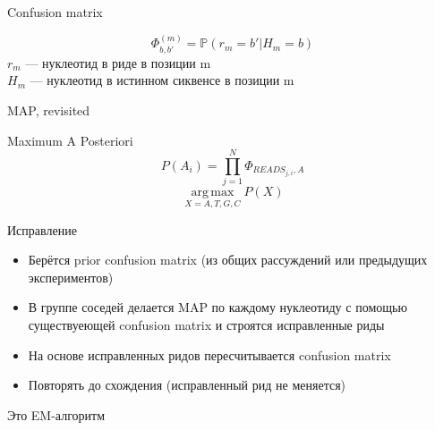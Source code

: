 \documentclass[10pt]{beamer}
\begin{document}
\begin{frame}{Confusion matrix}
  \begin{center}
    \Large
    \begin{equation*}
      \Phi^{(m)}_{b,b'} = \mathds{P}(r_m = b' | H_m = b)
    \end{equation*}
    \large
    $r_m$ — нуклеотид в риде в позиции m\\
    $H_m$ — нуклеотид в истинном сиквенсе в позиции m
  \end{center}
\end{frame}

\begin{frame}{MAP, revisited}
  \begin{center}
    \Large
    Maximum A Posteriori
    \[P(A_i) = \prod_{j=1}^{N} \Phi_{READS_{j,i}, A}\]
    \[\operatorname*{arg\,max}_{X=A,T,G,C} P(X)\]
  \end{center}
\end{frame}

\begin{frame}{Исправление}
  \begin{itemize}
  \item Берётся prior confusion matrix (из общих рассуждений или
    предыдущих экспериментов)
  \item В группе соседей делается MAP по каждому нуклеотиду с помощью
    существуеющей confusion matrix и строятся исправленные риды
  \item На основе исправленных ридов пересчитывается confusion matrix
  \item Повторять до схождения (исправленный рид не меняется)
  \end{itemize}
  Это EM-алгоритм
\end{frame}

\begin{frame}[plain]
\end{frame}
\end{document}

